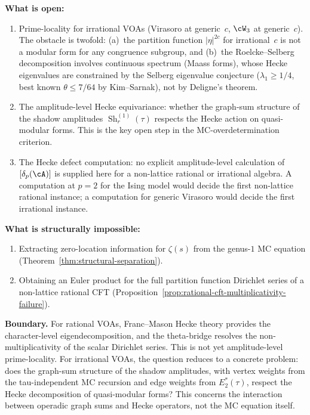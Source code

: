 \begin{remark}
\textbf{What is open:}
\begin{enumerate}[label=\textup{(\arabic*)}]
\item Prime-locality for irrational VOAs
 \textup{(}Virasoro at generic~$c$, $\cW_3$ at generic~$c$\textup{)}.
 The obstacle is twofold: \textup{(a)}~the partition function
 $|\eta|^{2c}$ for irrational~$c$ is not a modular form for
 any congruence subgroup, and \textup{(b)}~the Roelcke--Selberg
 decomposition involves continuous spectrum \textup{(}Maass forms\textup{)},
 whose Hecke eigenvalues are constrained by the Selberg
 eigenvalue conjecture
 \textup{(}$\lambda_1 \ge 1/4$, best known $\theta \le 7/64$
 by Kim--Sarnak\textup{)}, not by Deligne's theorem.
\item The amplitude-level Hecke equivariance: whether the
 graph-sum structure of the shadow amplitudes
 $\operatorname{Sh}_r^{(1)}(\tau)$ respects the Hecke action
 on quasi-modular forms. This is the key open step in the
 MC-overdetermination criterion.
\item The Hecke defect computation: no explicit amplitude-level
 calculation of $[\delta_p(\cA)]$ is supplied here for a non-lattice
 rational or irrational algebra. A computation at $p = 2$ for the
 Ising model would decide the first non-lattice rational instance;
 a computation for generic Virasoro would decide the first
 irrational instance.
\end{enumerate}

\textbf{What is structurally impossible:}
\begin{enumerate}[label=\textup{(\arabic*)}]
\item Extracting zero-location information for $\zeta(s)$ from
 the genus-$1$ MC equation
 \textup{(}Theorem~\textup{\ref{thm:structural-separation}}\textup{)}.
\item Obtaining an Euler product for the full partition
 function Dirichlet series of a non-lattice rational CFT
 \textup{(}Proposition~\textup{\ref{prop:rational-cft-multiplicativity-failure}}\textup{)}.
\end{enumerate}

\textbf{Boundary.}
For rational VOAs, Franc--Mason Hecke theory provides the
character-level eigendecomposition, and the theta-bridge resolves
the non-multiplicativity of the scalar Dirichlet series. This is not
yet amplitude-level prime-locality.
For irrational VOAs, the question reduces to a concrete
problem: does the graph-sum structure of the shadow amplitudes,
with vertex weights from the tau-independent MC recursion and
edge weights from $E_2^*(\tau)$, respect the Hecke decomposition
of quasi-modular forms? This concerns the interaction between
operadic graph sums and Hecke operators, not the MC equation
itself.


\end{remark}
